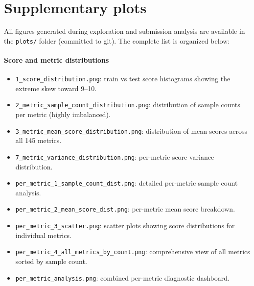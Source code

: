 \documentclass[11pt]{article}
\begin{document}
\appendix
\section{Supplementary plots}
\label{app:plots}
All figures generated during exploration and submission analysis are available in the \texttt{plots/} folder (committed to git). The complete list is organized below:

\paragraph{Score and metric distributions}
\begin{itemize}[leftmargin=1.5em]
  \item \texttt{1\_score\_distribution.png}: train vs test score histograms showing the extreme skew toward 9--10.
  \item \texttt{2\_metric\_sample\_count\_distribution.png}: distribution of sample counts per metric (highly imbalanced).
  \item \texttt{3\_metric\_mean\_score\_distribution.png}: distribution of mean scores across all 145 metrics.
  \item \texttt{7\_metric\_variance\_distribution.png}: per-metric score variance distribution.
  \item \texttt{per\_metric\_1\_sample\_count\_dist.png}: detailed per-metric sample count analysis.
  \item \texttt{per\_metric\_2\_mean\_score\_dist.png}: per-metric mean score breakdown.
  \item \texttt{per\_metric\_3\_scatter.png}: scatter plots showing score distributions for individual metrics.
  \item \texttt{per\_metric\_4\_all\_metrics\_by\_count.png}: comprehensive view of all metrics sorted by sample count.
  \item \texttt{per\_metric\_analysis.png}: combined per-metric diagnostic dashboard.
\end{itemize}
\end{document}
